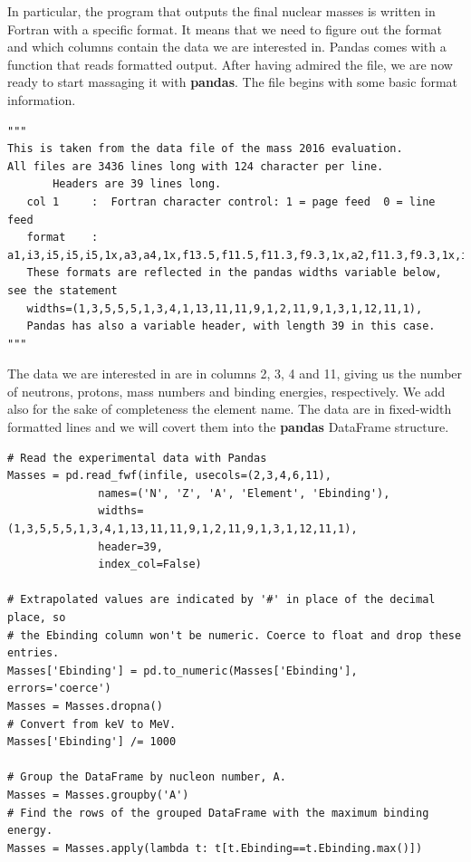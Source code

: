 \documentclass[%
oneside,                 %
final,                   %
10pt]{article}
\begin{document}
In particular, the program that outputs the final nuclear masses is written in Fortran with a specific format. It means that we need to figure out the format and which columns contain the data we are interested in. Pandas comes with a function that reads formatted output. After having admired the file, we are now ready to start massaging it with \textbf{pandas}. The file begins with some basic format information.
\begin{verbatim}
"""                                                                                                                         
This is taken from the data file of the mass 2016 evaluation.                                                               
All files are 3436 lines long with 124 character per line.                                                                  
       Headers are 39 lines long.                                                                                           
   col 1     :  Fortran character control: 1 = page feed  0 = line feed                                                     
   format    :  a1,i3,i5,i5,i5,1x,a3,a4,1x,f13.5,f11.5,f11.3,f9.3,1x,a2,f11.3,f9.3,1x,i3,1x,f12.5,f11.5                     
   These formats are reflected in the pandas widths variable below, see the statement                                       
   widths=(1,3,5,5,5,1,3,4,1,13,11,11,9,1,2,11,9,1,3,1,12,11,1),                                                            
   Pandas has also a variable header, with length 39 in this case.                                                          
"""
\end{verbatim}

The data we are interested in are in columns 2, 3, 4 and 11, giving us
the number of neutrons, protons, mass numbers and binding energies,
respectively. We add also for the sake of completeness the element name. The data are in fixed-width formatted lines and we will
covert them into the \textbf{pandas} DataFrame structure.

\begin{verbatim}
# Read the experimental data with Pandas
Masses = pd.read_fwf(infile, usecols=(2,3,4,6,11),
              names=('N', 'Z', 'A', 'Element', 'Ebinding'),
              widths=(1,3,5,5,5,1,3,4,1,13,11,11,9,1,2,11,9,1,3,1,12,11,1),
              header=39,
              index_col=False)

# Extrapolated values are indicated by '#' in place of the decimal place, so
# the Ebinding column won't be numeric. Coerce to float and drop these entries.
Masses['Ebinding'] = pd.to_numeric(Masses['Ebinding'], errors='coerce')
Masses = Masses.dropna()
# Convert from keV to MeV.
Masses['Ebinding'] /= 1000

# Group the DataFrame by nucleon number, A.
Masses = Masses.groupby('A')
# Find the rows of the grouped DataFrame with the maximum binding energy.
Masses = Masses.apply(lambda t: t[t.Ebinding==t.Ebinding.max()])
\end{verbatim}
\end{document}
